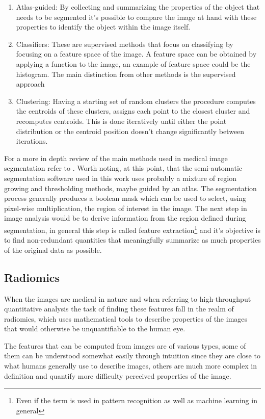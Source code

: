\begin{enumerate}
\item Atlas-guided: By collecting and summarizing the properties of the object that needs to be segmented it's possible to compare the image at hand with these properties to identify the object within the image itself.

\item Classifiers: These are supervised methods that focus on classifying by focusing on a feature space of the image. A feature space can be obtained by applying a function to the image, an example of feature space could be the histogram. The main distinction from other methods is the supervised approach

\item Clustering: Having a starting set of random clusters the procedure computes the centroids of these clusters, assigns each point to the closest cluster and recomputes centroids. This is done iteratively until either the point distribution or the centroid position doesn't change significantly between iterations.
\end{enumerate}

For a more in depth review of the main methods used in medical image segmentation refer to \cite{Medical_img_segmentation}. Worth noting, at this point, that the semi-automatic segmentation software used in this work uses probably a mixture of region growing and thresholding methods, maybe guided by an atlas.
The segmentation process generally produces a boolean mask which can be used to select, using pixel-wise multiplication, the region of interest in the image. The next step in image analysis would be to derive information from the region defined during segmentation, in general this step is called feature extraction\footnote{Even if the term is used in pattern recognition as well as machine learning in general} and it's objective is to find non-redundant quantities that meaningfully summarize as much properties of the original data as possible.

\subsection{Radiomics}
 When the images are medical in nature and when referring to high-throughput quantitative analysis the task of finding these features fall in the realm of radiomics, which uses mathematical tools to describe properties of the images that would otherwise be unquantifiable to the human eye.

The features that can be computed from images are of various types, some of them can be understood somewhat easily through intuition since they are close to what humans generally use to describe images, others are much more complex in definition and quantify more difficulty perceived properties of the image. 

